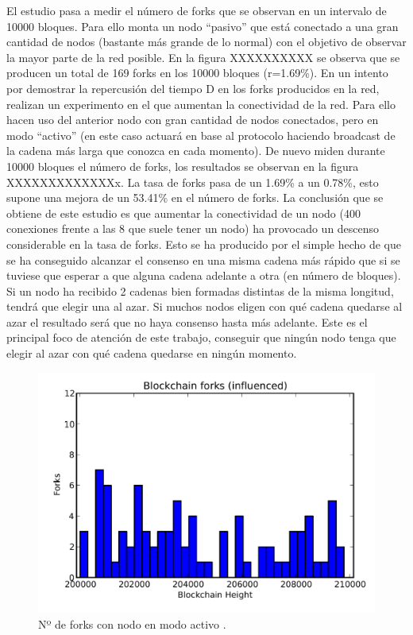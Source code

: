El estudio pasa a medir el número de forks que se observan en un intervalo de 10000 bloques. Para ello monta un nodo “pasivo” que está conectado a una gran cantidad de nodos (bastante más grande de lo normal) con el objetivo de observar la mayor parte de la red posible. En la figura XXXXXXXXXX se observa que se producen un total de 169 forks en los 10000 bloques (r=1.69\%). En un intento por demostrar la repercusión del tiempo D en los forks producidos en la red, realizan un experimento en el que aumentan la conectividad de la red. Para ello hacen uso del anterior nodo con gran cantidad de nodos conectados, pero en modo “activo” (en este caso actuará en base al protocolo haciendo broadcast de la cadena más larga que conozca en cada momento). De nuevo miden durante 10000 bloques el número de forks, los resultados se observan en la figura XXXXXXXXXXXXXx. La tasa de forks pasa de un 1.69\% a un 0.78\%, esto supone una mejora de un 53.41\% en el número de forks. La conclusión que se obtiene de este estudio es que aumentar la conectividad de un nodo (400 conexiones frente a las 8 que suele tener un nodo) ha provocado un descenso considerable en la tasa de forks. Esto se ha producido por el simple hecho de que se ha conseguido alcanzar el consenso en una misma cadena más rápido que si se tuviese que esperar a que alguna cadena adelante a otra (en número de bloques). Si un nodo ha recibido 2 cadenas bien formadas distintas de la misma longitud, tendrá que elegir una al azar. Si muchos nodos eligen con qué cadena quedarse al azar el resultado será que no haya consenso hasta más adelante. Este es el principal foco de atención de este trabajo, conseguir que ningún nodo tenga que elegir al azar con qué cadena quedarse en ningún momento. \newline


\begin{figure}
	\centering
	\includegraphics[width=1\textwidth]{imagenes/figura3.PNG}
	\caption{\label{fig1}Nº de forks con nodo en modo activo \cite{forks}.}
\end{figure}

